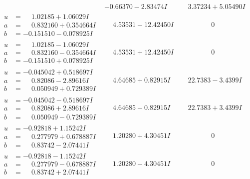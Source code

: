 \documentclass[1p]{elsarticle_modified}
\theoremstyle{definition}
\begin{document}
$$\begin{array}{c|c|c}
 & -0.66370 - 2.83474 I & \phantom{-}3.37234 + 5.05490 I \\ \hline\begin{aligned}
u &= \phantom{-}1.02185 + 1.06029 I \\
a &= \phantom{-}0.832160 + 0.354664 I \\
b &= -0.151510 - 0.078925 I\end{aligned}
 & \phantom{-}4.53531 - 12.42450 I & \phantom{-0.000000 } 0 \\ \hline\begin{aligned}
u &= \phantom{-}1.02185 - 1.06029 I \\
a &= \phantom{-}0.832160 - 0.354664 I \\
b &= -0.151510 + 0.078925 I\end{aligned}
 & \phantom{-}4.53531 + 12.42450 I & \phantom{-0.000000 } 0 \\ \hline\begin{aligned}
u &= -0.045042 + 0.518697 I \\
a &= \phantom{-}0.82086 - 2.89616 I \\
b &= \phantom{-}0.050949 + 0.729389 I\end{aligned}
 & \phantom{-}4.64685 + 0.82915 I & \phantom{-}22.7383 - 3.4399 I \\ \hline\begin{aligned}
u &= -0.045042 - 0.518697 I \\
a &= \phantom{-}0.82086 + 2.89616 I \\
b &= \phantom{-}0.050949 - 0.729389 I\end{aligned}
 & \phantom{-}4.64685 - 0.82915 I & \phantom{-}22.7383 + 3.4399 I \\ \hline\begin{aligned}
u &= -0.92818 + 1.15242 I \\
a &= \phantom{-}0.277979 + 0.678887 I \\
b &= \phantom{-}0.83742 - 2.07441 I\end{aligned}
 & \phantom{-}1.20280 + 4.30451 I & \phantom{-0.000000 } 0 \\ \hline\begin{aligned}
u &= -0.92818 - 1.15242 I \\
a &= \phantom{-}0.277979 - 0.678887 I \\
b &= \phantom{-}0.83742 + 2.07441 I\end{aligned}
 & \phantom{-}1.20280 - 4.30451 I & \phantom{-0.000000 } 0 \\ \hline\begin{aligned}

\end{aligned}
\end{array}$$
\end{document}
